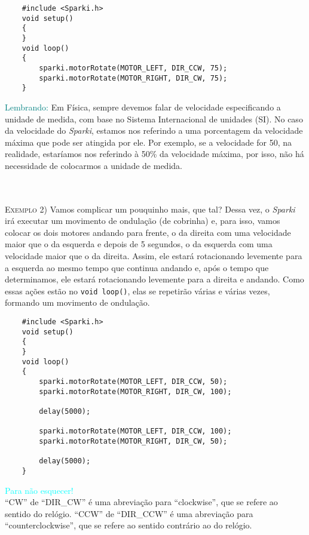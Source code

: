 \begin{verbatim}
    #include <Sparki.h>
    void setup()
    {
    }
    void loop()
    {
        sparki.motorRotate(MOTOR_LEFT, DIR_CCW, 75);
        sparki.motorRotate(MOTOR_RIGHT, DIR_CW, 75);
    }
\end{verbatim}

\begin{center}
    \textcolor{teal}{Lembrando:} Em Física, sempre devemos falar de velocidade especificando a unidade de medida, com base no Sistema Internacional de unidades (SI). No caso da velocidade do \textsl{Sparki}, estamos nos referindo a uma porcentagem da velocidade máxima que pode ser atingida por ele. Por exemplo, se a velocidade for 50, na realidade, estaríamos nos referindo à 50\% da velocidade máxima, por isso, não há necessidade de colocarmos a unidade de medida.
\end{center}
\\
\\
\textsc{Exemplo 2)} Vamos complicar um pouquinho mais, que tal? Dessa vez, o \textsl{Sparki} irá executar um movimento de ondulação (de cobrinha) e, para isso, vamos colocar os dois motores andando para frente, o da direita com uma velocidade maior que o da esquerda e depois de 5 segundos, o da esquerda com uma velocidade maior que o da direita. Assim, ele estará rotacionando levemente para a esquerda ao mesmo tempo que continua andando e, após o tempo que determinamos, ele estará rotacionando levemente para a direita e andando. Como essas ações estão no \texttt{void loop()}, elas se repetirão várias e várias vezes, formando um movimento de ondulação.

\begin{verbatim}
    #include <Sparki.h>
    void setup()
    {
    }
    void loop()
    {
        sparki.motorRotate(MOTOR_LEFT, DIR_CCW, 50);
        sparki.motorRotate(MOTOR_RIGHT, DIR_CW, 100);
        
        delay(5000);
        
        sparki.motorRotate(MOTOR_LEFT, DIR_CCW, 100);
        sparki.motorRotate(MOTOR_RIGHT, DIR_CW, 50);
        
        delay(5000);
    }
\end{verbatim}

\begin{center}
    \textcolor{cyan}{Para não esquecer!}
    \\``CW'' de ``DIR\_CW'' é uma abreviação para ``clockwise'', que se refere ao sentido do relógio. ``CCW'' de ``DIR\_CCW'' é uma abreviação para ``counterclockwise'', que se refere ao sentido contrário ao do relógio.
\end{center}


